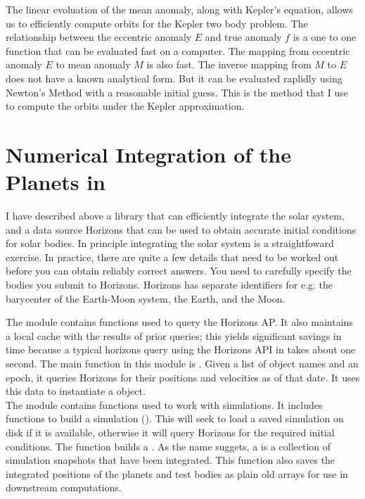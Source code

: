 The linear evoluation of the mean anomaly, along with Kepler's equation, allows us to efficiently compute orbits for the Kepler two body problem.
The relationship between the eccentric anomaly $E$ and true anomaly $f$ is a one to one function that can be evaluated fast on a computer.
The mapping from eccentric anomaly $E$ to mean anomaly $M$ is also fast.
The inverse mapping from $M$ to $E$ does not have a known analytical form.
But it can be evaluated raplidly using Newton's Method with a reasonable initial guess.
This is the method that I use to compute the orbits under the Kepler approximation. 

\section{Numerical Integration of the Planets in }
\label{section_numerical_integration}

I have described above a library  that can efficiently integrate the solar system,
and a data source Horizons that can be used to obtain accurate initial conditions for solar bodies.
In principle integrating the solar system is a straightfoward exercise.
In practice, there are quite a few details that need to be worked out before you can obtain reliably correct answers.
You need to carefully specify the bodies you submit to Horizons.
Horizons has separate identifiers for e.g. the barycenter of the Earth-Moon system, the Earth, and the Moon.

The module  contains functions used to query the Horizons AP.
It also maintains a local cache with the results of prior queries; 
this yields significant savings in time because a typical horizons query using the Horizons API in  takes about one second.
The main function in this module is .
Given a list of object names and an epoch, it queries Horizons for their positions and velocities as of that date.
It uses this data to instantiate a  object. \\
The module  contains functions used to work with  simulations.
It includes functions to build a simulation ().
This will seek to load a saved simulation on disk if it is available, otherwise it will query Horizons for the required initial conditions.
The function  builds a .
As the name suggets, a  is a collection of simulation snapshots that  have been integrated.
This function also saves the integrated positions of the planets and test bodies as plain old  arrays for use in downstream computations.

